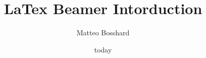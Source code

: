 \documentclass{beamer}
\title{LaTex{} Beamer Intorduction}
\author{Matteo Bosshard}
\date{today}
\begin{document}
\begin{frame}

\end{frame}
\end{document}
